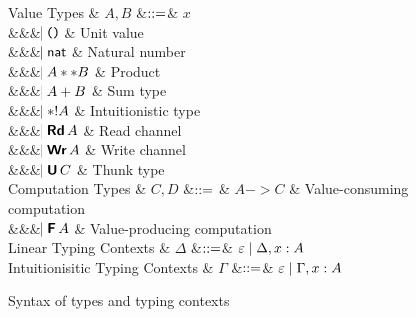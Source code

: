 \documentclass{llncs}
\begin{document}
\begin{figure}[htbp]
  \centering

\begin{grammar}
  Value Types
  & $A,B$
      &$\mathrel{::=}$&
      $x$
      \\ &&& $\bnfaltbrk \unitexp$ & Unit value
      \\ &&& $\hspace{-1.02ex}\mathrel{\mid} \mathsf{nat}$         & Natural number
      \\ &&& $\hspace{-1.02ex}\mathrel{\mid} A ** B$ & Product
      \\ &&& $\hspace{-1.02ex}\mathrel{\mid} A + B$ & Sum type
      \\ &&& $\hspace{-1.02ex}\mathrel{\mid} *! A$ & Intuitionistic type
      \\ &&& $\bnfaltbrk \Rd A$ & Read channel
      \\ &&& $\bnfaltbrk \Wr A$ & Write channel
      \\ &&& $\bnfaltbrk \U C$ & Thunk type
  \\[1ex]
  Computation Types
  & $C, D$
      &$\mathrel{::=}$ & 
             $A -> C$ & Value-consuming computation
      \\ &&& $\bnfaltbrk \F A$ & Value-producing computation
  \\[1ex]
  Linear Typing Contexts
  & $\Delta$
     &$\mathrel{::=}$& $\varepsilon \mathrel{\mid} \Delta,x:A$
  \\
  Intuitionisitic Typing Contexts
  & $\Gamma$
     &$\mathrel{::=}$& $\varepsilon \mathrel{\mid} \Gamma,x:A$
\end{grammar}

  \caption{Syntax of types and typing contexts}
  \label{fig:expr}
\end{figure}
\end{document}
